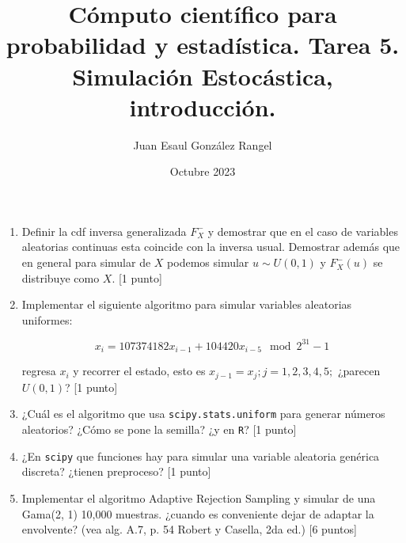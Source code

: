 \documentclass{article}
\title{Cómputo científico para probabilidad y estadística. Tarea 5.\\
Simulación Estocástica, introducción.}
\author{Juan Esaul González Rangel}
\date{Octubre 2023}
\begin{document}
\maketitle


\begin{enumerate}

    \item Definir la cdf inversa generalizada $F^-_X$ y demostrar que en el caso de 
    variables aleatorias continuas esta coincide con la inversa usual. Demostrar 
    además que en general para simular de $X$ podemos simular $u \sim U (0, 1)$ y 
    $F^-_X (u)$ se distribuye como $X$. [1 punto]

    \item Implementar el siguiente algoritmo para simular variables aleatorias 
    uniformes:
    
    \[ x_i = 107374182x_{i-1} + 104420x_{i-5} \mod 2^{31} - 1\]
    
    regresa $x_i$ y recorrer el estado, esto es $x_{j-1} = x_j ; j = 1, 2, 3, 4, 5;$ 
    ¿parecen $U (0, 1)$? [1 punto]

    \item ¿Cuál es el algoritmo que usa \texttt{scipy.stats.uniform} para generar 
    números aleatorios? ¿Cómo se pone la semilla? ¿y en \texttt{R}? [1 punto]

    \item ¿En \texttt{scipy} que funciones hay para simular una variable aleatoria 
    genérica discreta? ¿tienen preproceso? [1 punto]

    \item Implementar el algoritmo Adaptive Rejection Sampling y simular de una 
    Gama(2, 1) 10,000 muestras. ¿cuando es conveniente dejar de adaptar la envolvente?
     (vea alg. A.7, p. 54 Robert y Casella, 2da ed.) [6 puntos]
   
\end{enumerate}




 
\end{document}
